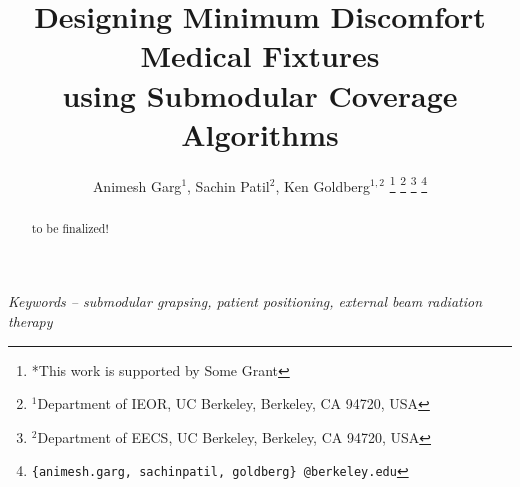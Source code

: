 \documentclass[letterpaper, 10 pt, conference]{ieeeconf}  %
\title{\LARGE \bf
Designing Minimum Discomfort Medical Fixtures \\
using Submodular Coverage Algorithms 
}
\author{Animesh Garg$^{1}$, Sachin Patil$^{2}$, Ken Goldberg$^{1,2}$%
\thanks{*This work is supported by Some Grant}%
\thanks{$^{1}$Department of IEOR, UC Berkeley,
	Berkeley, CA 94720, USA}%
\thanks{$^{2}$Department of EECS, UC Berkeley,
        Berkeley, CA 94720, USA}%
\thanks{{\tt\small \{animesh.garg, sachinpatil, goldberg\} @berkeley.edu}}%
}
\begin{document}
\maketitle
\thispagestyle{empty}
\pagestyle{empty}


\begin{abstract}
to be finalized!
\end{abstract}

\noindent \textit{ Keywords -- submodular grapsing, patient positioning, external beam radiation therapy}


%
%
%
%
%



\addtolength{\textheight}{-12cm}  

%
%



\end{document}
